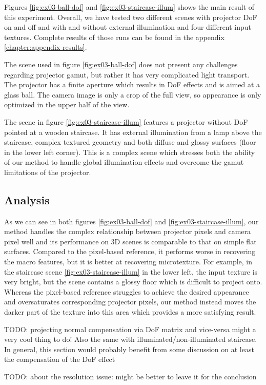 Figures \ref{fig:ex03-ball-dof} and \ref{fig:ex03-staircase-illum} shows the main result of this experiment. Overall, we have tested two different scenes with projector DoF on and off and with and without external illumination and four different input textures. Complete results of those runs can be found in the appendix \ref{chapter:appendix-results}.

The scene used in figure \ref{fig:ex03-ball-dof} does not present any challenges regarding projector gamut, but rather it has very complicated light transport. The projector has a finite aperture which results in DoF effects and is aimed at a glass ball. The camera image is only a crop of the full view, so appearance is only optimized in the upper half of the view.

The scene in figure \ref{fig:ex03-staircase-illum} features a projector without DoF pointed at a wooden staircase. It has external illumination from a lamp above the staircase, complex textured geometry and both diffuse and glossy surfaces (floor in the lower left corner). This is a complex scene which stresses both the ability of our method to handle global illumination effects and overcome the gamut limitations of the projector.

\subsection{Analysis}
\label{section:results-experiments-03-analysis}

As we can see in both figures \ref{fig:ex03-ball-dof} and \ref{fig:ex03-staircase-illum}, our method handles the complex relationship between projector pixels and camera pixel well and its performance on 3D scenes is comparable to that on simple flat surfaces. Compared to the pixel-based reference, it performs worse in recovering the macro features, but it is better at recovering microtexture. For example, in the staircase scene \ref{fig:ex03-staircase-illum} in the lower left, the input texture is very bright, but the scene contains a glossy floor which is difficult to project onto. Whereas the pixel-based reference struggles to achieve the desired appearance and oversaturates corresponding projector pixels, our method instead moves the darker part of the texture into this area which provides a more satisfying result.

{\color{red} TODO: projecting normal compensation via DoF matrix and vice-versa might a very cool thing to do! Also the same with illuminated/non-illuminated staircase. In general, this section would probably benefit from some discussion on at least the compensation of the DoF effect}

{\color{red} TODO: about the resolution issue: might be better to leave it for the conclusion}